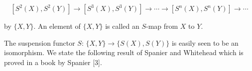 $$[S^2(X), S^2(Y)] \rightarrow [S^3(X), S^3(Y)] \rightarrow \cdots \rightarrow [S^n(X), S^n(Y)] \rightarrow \cdots$$

by $\{X, Y\}$. An element of $\{X, Y\}$ is called an $S$-map from $X$ to $Y$.

The suspension functor $S$: $\{X, Y\} \rightarrow \{S(X), S(Y)\}$ is easily seen to be an isomorphism. We state the following result of Spanier and Whitehead which is proved in a book by Spanier [3].
